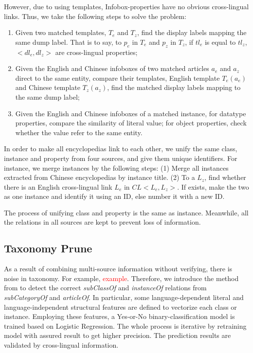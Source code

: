 \documentclass[runningheads,a4paper]{llncs}
\begin{document}
\begin{CJK*}{UTF8}{song}
However, due to using templates, Infobox-properties have no obvious cross-lingual links. Thus, we take the following steps to solve the problem:
\begin{enumerate}
    \item Given two matched templates, $T_{e}$ and $T_{z}$, find the display labels mapping the same dump label. That is to say, to $p_{e}$ in $T_{e}$ and $p_{z}$ in $T_{z}$, if $tl_{e}$ is equal to $tl_{z}$, $<dl_{e},dl_{z}>$ are cross-lingual properties;
    \item Given the English and Chinese infoboxes of two matched articles $a_{e}$ and $a_{z}$ direct to the same entity, compare their templates, English template $T_{e}(a_{e})$ and Chinese template $T_{z}(a_{z})$, find the matched display labels mapping to the same dump label;
    \item Given the English and Chinese infoboxes of a matched instance, for datatype properties, compare the similarity of literal value; for object properties, check whether the value refer to the same entity.
\end{enumerate}

In order to make all encyclopedias link to each other, we unify the same class, instance and property from four sources, and give them unique identifiers. For instance, we merge instances by the following steps: (1) Merge all instances extracted from Chinese encyclopedias by instance title. (2) To a $L_{z}$, find whether there is an English cross-lingual link $L_{e}$ in $CL<L_{e}, L_{z}>$. If exists, make the two as one instance and identify it using an ID, else number it with a new ID.

The process of unifying class and property is the same as instance. Meanwhile, all the relations in all sources are kept to prevent loss of information.

\subsection{Taxonomy Prune}
\label{sec:tp}

As a result of combining multi-source information without verifying, there is noise in taxonomy. For example, \textcolor{red}{example}. Therefore, we introduce the method from\cite{wang2014cross} to detect the correct \textit{subClassOf} and \textit{instanceOf} relations from \textit{subCategoryOf} and \textit{articleOf}. %
In particular, some language-dependent literal and language-independent structural features are defined to vectorize each class or instance. Employing these features, a Yes-or-No binary-classification model is trained based on Logistic Regression. The whole process is iterative by retraining model with assured result to get higher precision. The prediction results are validated by cross-lingual information.


\end{CJK*}
\end{document}
